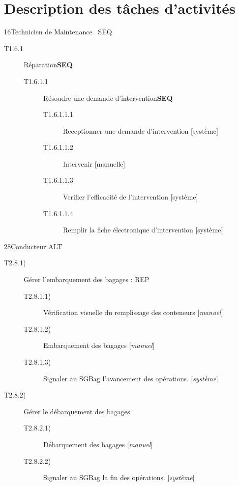 \part{Description des tâches d'activités}
{1}{6}{Technicien de Maintenance}{~}
{SEQ}
{
\begin{description}
	\item[T1.6.1] Réparation\textbf{SEQ}
	\begin{description}
		\item[T1.6.1.1] Résoudre une demande d'intervention\textbf{SEQ}
		\begin{description}
			\item[T1.6.1.1.1] Receptionner une demande d'intervention [système]
			\item[T1.6.1.1.2] Intervenir [manuelle]
			\item[T1.6.1.1.3] Verifier l'efficacité de l'intervention [système]
			\item[T1.6.1.1.4] Remplir la fiche électronique d'intervention [système]
		\end{description}
	\end{description}
\end{description}
}

\dta
{2}{8}{Conducteur}
{ALT}
{
\begin{description}
	\item [T2.8.1)] Gérer l'embarquement des bagages : REP
	\begin{description}
		\item [T2.8.1.1)] Vérification visuelle du remplissage des conteneurs [\textsl{manuel}]
		\item [T2.8.1.2)] Embarquement des bagages [\textsl{manuel}]
		\item [T2.8.1.3)] Signaler au SGBag l'avancement des opérations. [\textsl{système}]
	\end{description}
	\item [T2.8.2)] Gérer le débarquement des bagages
		\begin{description}
			\item [T2.8.2.1)] Débarquement des bagages [\textsl{manuel}]
			\item [T2.8.2.2)] Signaler au SGBag la fin des opérations. [\textsl{système}]
		\end{description}
\end{description}
}


